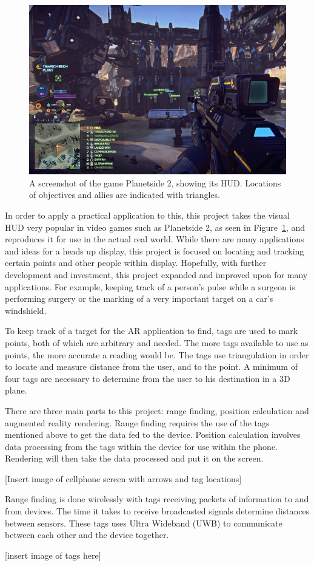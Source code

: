 \begin{figure}
	\centering
	\includegraphics[width=\linewidth]{Figures/GameHUD.jpg}
	\decoRule
	\caption{A screenshot of the game Planetside 2, showing its HUD. Locations of objectives and allies are indicated with triangles.}
	\label{fig:GameHUD}
\end{figure}

In order to apply a practical application to this, this project takes the visual HUD very popular in video games such as Planetside 2, as seen in Figure~\ref{fig:GameHUD}, and reproduces it for use in the actual real world.  While there are many applications and ideas for a heads up display, this project is focused on locating and tracking certain points and other people within display. Hopefully, with further development and investment, this project expanded and improved upon for many applications. For example, keeping track of a person’s pulse while a surgeon is performing surgery or the marking of a very important target on a car’s windshield.

To keep track of a target for the AR application to find, tags are used to mark points, both of which are arbitrary and needed. The more tags available to use as points, the more accurate a reading would be. The tags use triangulation in order to locate and measure distance from the user, and to the point. A minimum of four tags are necessary to determine from the user to his destination in a 3D plane.

There are three main parts to this project: range finding, position calculation and augmented reality rendering. Range finding requires the use of the tags mentioned above to get the data fed to the device. Position calculation involves data processing from the tags within the device for use within the phone. Rendering will then take the data processed and put it on the screen.

[Insert image of cellphone screen with arrows and tag locations]

Range finding is done wirelessly with tags receiving packets of information to and from devices. The time it takes to receive broadcasted signals determine distances between sensors. These tags uses Ultra Wideband (UWB) to communicate between each other and the device together.

[insert image of tags here]
